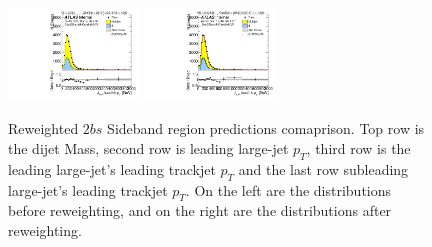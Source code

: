\begin{figure}[htbp!]
\begin{center}
\includegraphics[width=0.31\textwidth,angle=-90]{figures/boosted/Prereweight/Moriond_TwoTag_split_Sideband_sublHCand_trk0_Pt.pdf}
\includegraphics[width=0.31\textwidth,angle=-90]{figures/boosted/Sideband/b77_TwoTag_split_Sideband_sublHCand_trk0_Pt.pdf}\\
\caption{Reweighted $2bs$ Sideband region predictions comaprison. Top row is the dijet Mass, second row is leading large-\R jet $p_{T}$, third row is the leading large-\R jet's leading trackjet $p_T$ and the last row subleading large-\R jet's leading trackjet $p_T$. On the left are the distributions before reweighting, and on the right are the distributions after reweighting.}
\label{fig:rw-2bs-comp-sb}
\end{center}
\end{figure}


